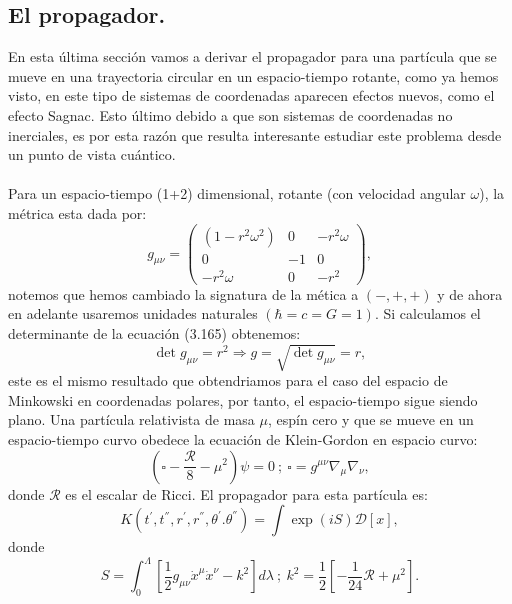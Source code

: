 \subsection{El propagador.}
En esta última sección vamos a derivar el propagador para una partícula que se mueve en una trayectoria circular en un espacio-tiempo rotante, como ya hemos visto, en este tipo de sistemas de coordenadas aparecen efectos nuevos, como el efecto Sagnac. Esto último debido a que son sistemas de coordenadas no inerciales, es por esta razón que resulta interesante estudiar este problema desde un punto de vista cuántico.
\\
\\
Para un espacio-tiempo (1+2) dimensional, rotante (con velocidad angular $\omega$), la métrica esta dada por:
\begin{equation}
g_{\mu\nu}=\left(\begin{array}{ccc}
(1-r^{2}\omega^{2}) & 0 & -r^{2}\omega\\
0 & -1 & 0\\
-r^{2}\omega & 0 & -r^{2}
\end{array}\right),
\end{equation}
notemos que hemos cambiado la signatura de la mética a $(-,+,+)$ y de ahora en adelante usaremos unidades naturales $(\hbar=c=G=1)$. Si calculamos el determinante de la ecuación (3.165) obtenemos:
\begin{equation}
\det g_{\mu\nu}=r^{2}\Rightarrow g=\sqrt{\det g_{\mu\nu}}=r,
\end{equation}
este es el mismo resultado que obtendriamos para el caso del espacio de Minkowski en coordenadas polares, por tanto, el espacio-tiempo sigue siendo plano. Una partícula relativista de masa $\mu$, espín cero y que se mueve en un espacio-tiempo curvo obedece la ecuación de Klein-Gordon en espacio curvo:
\begin{equation}
\left(\square-\frac{\mathcal{R}}{8}-\mu^{2}\right)\psi=0\ ;\ \square=g^{\mu\nu}\nabla_{\mu}\nabla_{\nu},
\end{equation} 
donde $\mathcal{R}$ es el escalar de Ricci. El propagador para esta partícula es:
\begin{equation}
K(t^{'},t^{''},r^{'},r^{''},\theta^{'}.\theta^{''})=\int\exp(iS)\mathcal{D}[x],
\end{equation}
donde
\begin{equation}
S=\int_{0}^{\Lambda}\left[\frac{1}{2}g_{\mu\nu}\dot{x}^{\mu}\dot{x}^{\nu}-k^{2}\right]d\lambda\ ;\ k^{2}=\frac{1}{2}\left[-\frac{1}{24}\mathcal{R}+\mu^{2}\right].	
\end{equation}
